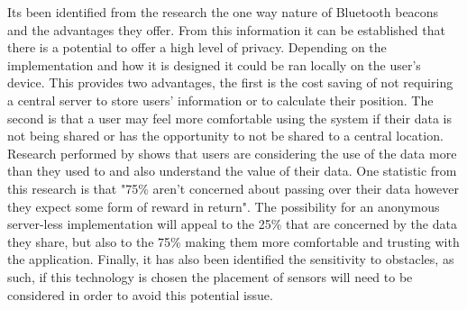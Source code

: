 Its been identified from the research the one way nature of Bluetooth beacons and the advantages they offer. From this information it can be established that there is a potential to offer a high level of privacy. Depending on the implementation and how it is designed it could be ran locally on the user's device. This provides two advantages, the first is the cost saving of not requiring a central server to store users' information or to calculate their position. The second is that a user may feel more comfortable using the system if their data is not being shared or has the opportunity to not be shared to a central location. Research performed by \cite{axel_2018_how} shows that users are considering the use of the data more than they used to and also understand the value of their data. One statistic from this research is that "75\% aren't concerned about passing over their data however they expect some form of reward in return". The possibility for an anonymous server-less implementation will appeal to the 25\% that are concerned by the data they share, but also to the 75\% making them more comfortable and trusting with the application. Finally, it has also been identified the sensitivity to obstacles, as such, if this technology is chosen the placement of sensors will need to be considered in order to avoid this potential issue.

